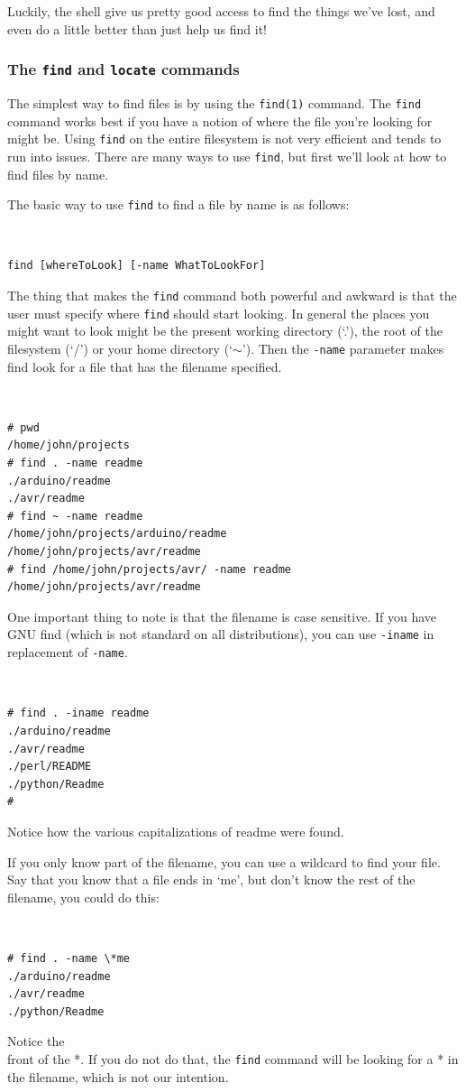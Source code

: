 Luckily, the shell give us pretty good access to find the things we've lost, and even do a little better than just help us find it!

\subsubsection{The {\tt find} and {\tt locate} commands}
The simplest way to find files is by using the {\tt find(1)} command.  The {\tt find} 
command works best if you have a notion of where the file you're looking for might be. 
Using {\tt find} on the entire filesystem is not very efficient and tends to run into issues. 
There are many ways to use {\tt find}, but first we'll look at how to find files by name.

The basic way to use {\tt find} to find a file by name is as follows:
{\tt
\begin{verbatim}
find [whereToLook] [-name WhatToLookFor]
\end{verbatim}
}
The thing that makes the {\tt find} command both powerful and awkward
is that the user must specify where {\tt find} should start looking. In general
the places you might want to look might be the present working directory (`.'), the 
root of the filesystem (`/') or your home directory (`$\sim$'). Then the {\tt -name} 
parameter makes find look for a file that has the filename specified. 
 
{\tt
\begin{verbatim}
# pwd
/home/john/projects
# find . -name readme
./arduino/readme
./avr/readme
# find ~ -name readme
/home/john/projects/arduino/readme
/home/john/projects/avr/readme
# find /home/john/projects/avr/ -name readme
/home/john/projects/avr/readme
\end{verbatim}
}
One important thing to note is that the filename is case sensitive. If you have 
GNU find (which is not standard on all distributions), you can use {\tt -iname} 
in replacement of {\tt -name}.
{\tt
\begin{verbatim}
# find . -iname readme
./arduino/readme
./avr/readme
./perl/README
./python/Readme
#
\end{verbatim}
}
Notice how the various capitalizations of readme were found.

If you only know part of the filename, you can use a wildcard 
to find your file.  Say that you know that a file ends in `me', 
but don't know the rest of the filename, you could do this:
{\tt
\begin{verbatim}
# find . -name \*me
./arduino/readme
./avr/readme
./python/Readme
\end{verbatim}
}
Notice the \\ front of the *.  If you do not do that, the 
{\tt find} command will be looking for a * in the filename, 
which is not our intention.

